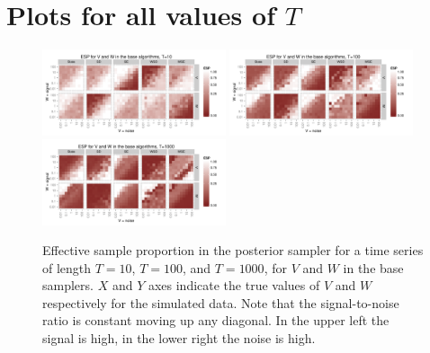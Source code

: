 \documentclass{article}
\begin{document}
\section{Plots for all values of $T$}\label{sec:plots}
\begin{figure}[!ht]
\centering
\includegraphics[width=0.48\textwidth]{../plots/baseESplot10}
\includegraphics[width=0.48\textwidth]{../plots/baseESplot100}
\includegraphics[width=0.48\textwidth]{../plots/baseESplot1000}
\caption{Effective sample proportion in the posterior sampler for a time series of length $T=10$, $T=100$, and $T=1000$, for $V$ and $W$ in the base samplers. $X$ and $Y$ axes indicate the true values of $V$ and $W$ respectively for the simulated data. Note that the signal-to-noise ratio is constant moving up any diagonal. In the upper left the signal is high, in the lower right the noise is high.}
\label{baseESplot}
\end{figure}
\end{document}
